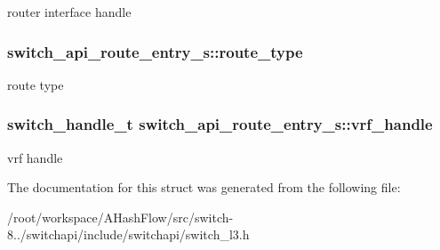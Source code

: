 router interface handle \hypertarget{structswitch__api__route__entry__s_abc9dc6b0ceda58ceb7181cc1a5174b6d}{
\subsubsection[{route\+\_\+type}]{ switch\+\_\+api\+\_\+route\+\_\+entry\+\_\+s\+::route\+\_\+type}}\label{structswitch__api__route__entry__s_abc9dc6b0ceda58ceb7181cc1a5174b6d}
route type \hypertarget{structswitch__api__route__entry__s_a6237f02132fe809a71ef0d87868159e0}{
\subsubsection[{vrf\+\_\+handle}]{\setlength{\rightskip}{0pt plus 5cm}switch\+\_\+handle\+\_\+t switch\+\_\+api\+\_\+route\+\_\+entry\+\_\+s\+::vrf\+\_\+handle}}\label{structswitch__api__route__entry__s_a6237f02132fe809a71ef0d87868159e0}
vrf handle 

The documentation for this struct was generated from the following file\+:\begin{DoxyCompactItemize}
\item 
/root/workspace/\+A\+Hash\+Flow/src/switch-\/8../switchapi/include/switchapi/switch\+\_\+l3.\+h\end{DoxyCompactItemize}
